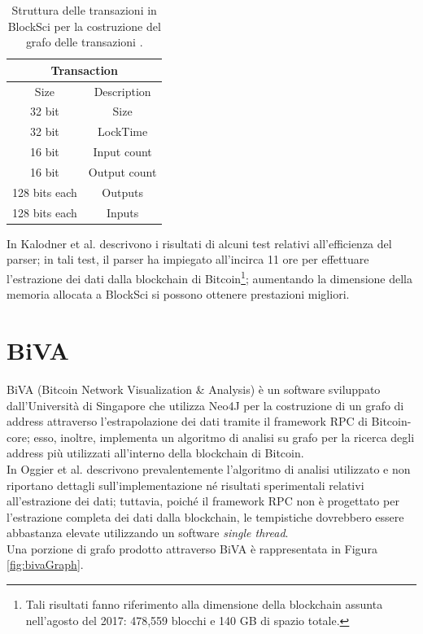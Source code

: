 \begin{table}
       \centering\small
           \begin{tabular}{|c|c|}
               \hline
                 \multicolumn{2}{|c|}{\textbf{Transaction}} \\
                 \hline
                 \multicolumn{1}{|c|}{Size} & \multicolumn{1}{c|}{Description} \\
               \hline \hline
               32 bit & Size   \\
               \hline
               32 bit & LockTime \\
               \hline
               16 bit & Input count \\
               \hline
               16 bit & Output count \\
               \hline
               128 bits each & ﻿Outputs \\
               \hline
               128 bits each & ﻿Inputs \\
               \hline
       \end{tabular}
       \caption{Struttura delle transazioni in BlockSci per la costruzione del grafo delle transazioni \cite{DBLP:journals/corr/abs-1709-02489}.\label{tab:blockSciSerialization}}
   \end{table}

In  \cite{DBLP:journals/corr/abs-1709-02489} Kalodner et al. descrivono i risultati di alcuni test relativi all'efficienza del parser; in tali test, il parser ha impiegato all'incirca 11 ore per effettuare l'estrazione dei dati dalla blockchain di Bitcoin\footnote{Tali risultati fanno riferimento alla dimensione della blockchain assunta nell'agosto del 2017: 478,559 blocchi e 140 GB di spazio totale.}; aumentando la dimensione della memoria allocata a BlockSci si possono ottenere prestazioni migliori.

\section{BiVA} \label{sec:biva}

BiVA (Bitcoin Network Visualization \& Analysis) è un software sviluppato dall'Università di Singapore che utilizza Neo4J \cite{neo4j} per la costruzione di un grafo di address attraverso l'estrapolazione dei dati tramite il framework RPC di Bitcoin-core; esso, inoltre, implementa un algoritmo di analisi su grafo per la ricerca degli address più utilizzati all'interno della blockchain di Bitcoin.\\
In \cite{DBLP:conf/icdm/OggierPD18} Oggier et al. descrivono prevalentemente l'algoritmo di analisi utilizzato e non riportano dettagli sull'implementazione né risultati sperimentali relativi all'estrazione dei dati; tuttavia, poiché il framework RPC non è progettato  per l'estrazione completa dei dati dalla blockchain, le tempistiche dovrebbero essere abbastanza elevate utilizzando un software \emph{single thread}.\\
Una porzione di grafo prodotto attraverso BiVA è rappresentata in Figura \ref{fig:bivaGraph}.

